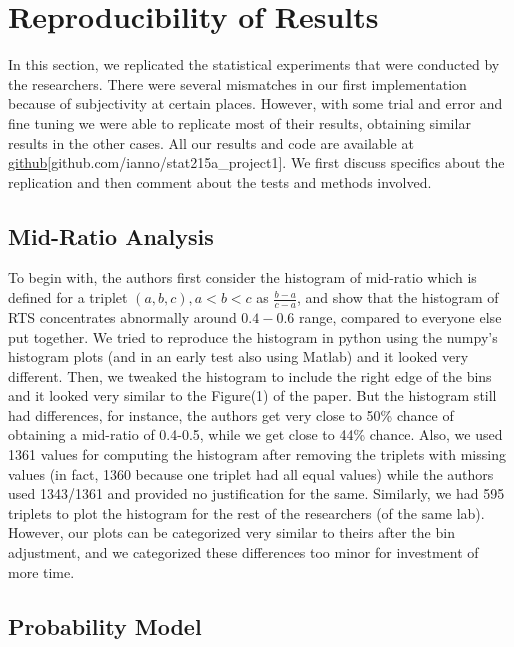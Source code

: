 \documentclass{article}
\begin{document}
    \section{Reproducibility of Results}\label{reproducibility-of-results}

In this section, we replicated the statistical experiments that were
conducted by the researchers. There were several mismatches in our first
implementation because of subjectivity at certain places. However, with
some trial and error and fine tuning we were able to replicate most of
their results, obtaining similar results in the other cases. All our
results and code are available at \hyperlink{https://github.com/ianno/stat215a_project1}{github}[github.com/ianno/stat215a\_project1]. We first discuss specifics about the replication and then comment about the tests and methods involved.


    \subsection{Mid-Ratio Analysis}\label{mid-ratio-analysis}

To begin with, the authors first consider the histogram of mid-ratio
which is defined for a triplet \((a, b, c), a<b<c\) as
\(\frac{b-a}{c-a}\), and show that the histogram of RTS concentrates
abnormally around \(0.4-0.6\) range, compared to everyone else put
together. We tried to reproduce the histogram in python using the
numpy's histogram plots (and in an early test also using Matlab) and it
looked very different. Then, we tweaked the histogram to include the
right edge of the bins and it looked very similar to the Figure(1) of
the paper. But the histogram still had differences, for instance, the
authors get very close to 50\% chance of obtaining a mid-ratio of
0.4-0.5, while we get close to 44\% chance. Also, we used 1361 values
for computing the histogram after removing the triplets with missing
values (in fact, 1360 because one triplet had all equal values) while
the authors used 1343/1361 and provided no justification for the same.
Similarly, we had 595 triplets to plot the histogram for the rest of the
researchers (of the same lab). However, our plots can be categorized
very similar to theirs after the bin adjustment, and we categorized
these differences too minor for investment of more time.

    \subsection{Probability Model}\label{probability-model}
\end{document}
